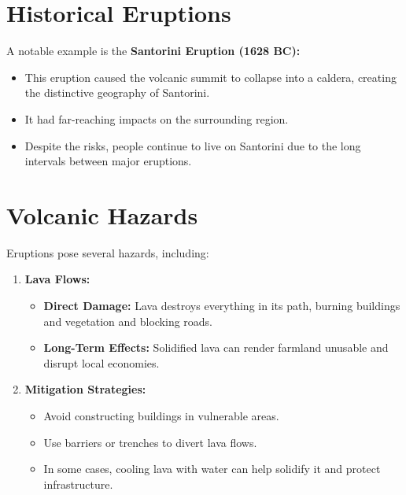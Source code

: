 \documentclass{article}
\begin{document}
\section*{Historical Eruptions}

A notable example is the \textbf{Santorini Eruption (1628 BC):}
\begin{itemize}
    \item This eruption caused the volcanic summit to collapse into a caldera, creating the distinctive geography of Santorini.
    \item It had far-reaching impacts on the surrounding region.
    \item Despite the risks, people continue to live on Santorini due to the long intervals between major eruptions.
\end{itemize}

\section*{Volcanic Hazards}

Eruptions pose several hazards, including:

\begin{enumerate}
    \item \textbf{Lava Flows:}
    \begin{itemize}
        \item \textbf{Direct Damage:} Lava destroys everything in its path, burning buildings and vegetation and blocking roads.
        \item \textbf{Long-Term Effects:} Solidified lava can render farmland unusable and disrupt local economies.
    \end{itemize}

    \item \textbf{Mitigation Strategies:}
    \begin{itemize}
        \item Avoid constructing buildings in vulnerable areas.
        \item Use barriers or trenches to divert lava flows.
        \item In some cases, cooling lava with water can help solidify it and protect infrastructure.
    \end{itemize}
\end{enumerate}
\end{document}
